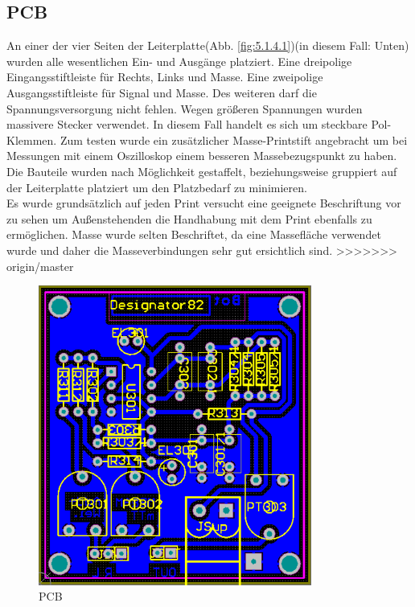 \subsection{PCB}\label{subsec:5.1.4}
An einer der vier Seiten der Leiterplatte(Abb. \ref{fig:5.1.4.1})(in diesem Fall: Unten) wurden alle wesentlichen Ein- und Ausgänge platziert. Eine dreipolige Eingangsstiftleiste für Rechts, Links und Masse. Eine zweipolige Ausgangsstiftleiste für Signal und Masse. Des weiteren darf die Spannungsversorgung nicht fehlen. Wegen größeren Spannungen wurden massivere Stecker verwendet. In diesem Fall handelt es sich um steckbare Pol-Klemmen. Zum testen wurde ein zusätzlicher Masse-Printstift angebracht um bei Messungen mit einem Oszilloskop einem besseren Massebezugspunkt zu haben.\\
Die Bauteile wurden nach Möglichkeit gestaffelt, beziehungsweise gruppiert auf der Leiterplatte platziert um den Platzbedarf zu minimieren.\\
Es wurde grundsätzlich auf jeden Print versucht eine geeignete Beschriftung vor zu sehen um Außenstehenden die Handhabung mit dem Print ebenfalls zu ermöglichen. Masse wurde selten Beschriftet, da eine Massefläche verwendet wurde und daher die Masseverbindungen sehr gut ersichtlich sind.
>>>>>>> origin/master
\begin{figure} [H]
	\centering
	\includegraphics[width=0.8\textwidth]{img/Print3/3mTTWeicheruAddierer-PCB.PNG}
	\caption{PCB}
	\label {fig:4.1.4.1}
\end{figure}









